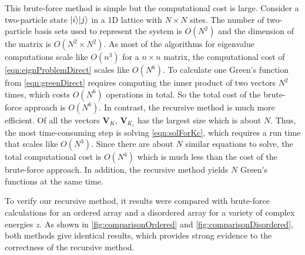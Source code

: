 This brute-force method is simple but the computational cost is large. Consider a 
two-particle state $| i \rangle| j \rangle$ in a 1D lattice with $N \times N$ sites. The number of two-particle basis sets used
to represent the system is $O(N^2)$ and the dimension of the matrix is $O(N^2 \times N^2)$. As most of the 
algorithms for eigenvalue computations scale like $O(n^3)$ for a $n\times n$ matrix, the computational cost of
\autoref{eqn:eignProblemDirect} scales like $O(N^6)$. To calculate one Green's function from 
\autoref{eqn:greenDirect} requires computing the inner product of  two vectors $N^2$ times, which 
costs $O(N^6)$ operations in total. So the total cost of the brute-force approach is $O(N^6)$. 
In contrast, the recursive method is much more efficient. Of all the vectors $\mathbf{V}_{K}$,  $\mathbf{V}_{K_c}$
has the largest size which is about $N$. Thus, the most time-consuming step is solving \autoref{eqn:solForKc},
which requires a run time that scales like $O(N^3)$. Since there are about $N$ similar equations to solve, the total
computational cost is $O(N^4)$ which is much less than the cost of the brute-force approach. In addition, the
recursive method yields $N$ Green's functions at the same time.

To verify our recursive method, it results were compared with brute-force calculations for an ordered array and a disordered array for 
a variety of complex energies $z$. 
As shown in
 \autoref{fig:comparisonOrdered} and \autoref{fig:comparisonDisordered}, both methods give identical results, which
provides strong evidence to the correctness of the recursive method. 

